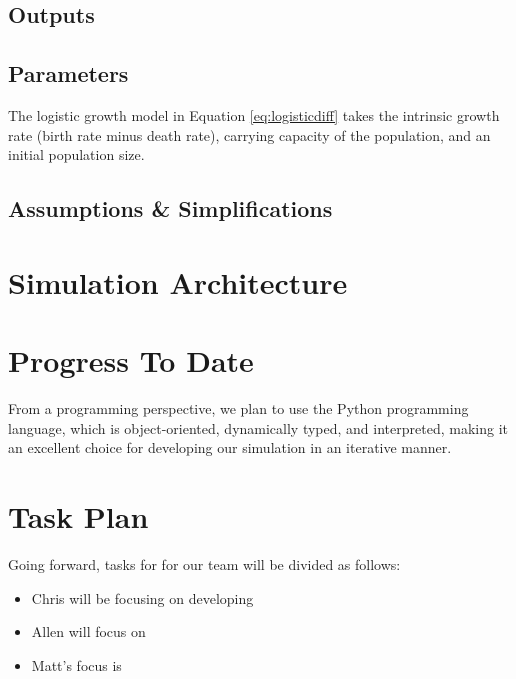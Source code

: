 \documentclass[12pt]{article}
\begin{document}
\subsection{Outputs}

\subsection{Parameters}

The logistic growth model in Equation \ref{eq:logisticdiff} takes the intrinsic
growth rate (birth rate minus death rate), carrying capacity of the population,
and an initial population size.

\subsection{Assumptions \& Simplifications}

\section{Simulation Architecture}
\label{sec:architecture}

\section{Progress To Date}
\label{sec:progress}

From a programming perspective, we plan to use the Python programming language,
which is object-oriented, dynamically typed, and interpreted, making it an
excellent choice for developing our simulation in an iterative manner.

\section{Task Plan}
\label{sec:taskplan}

Going forward, tasks for for our team will be divided as follows:

\begin{itemize}
  \item Chris will be focusing on developing
  \item Allen will focus on
  \item Matt's focus is
\end{itemize}

\clearpage
{}

\end{document}
